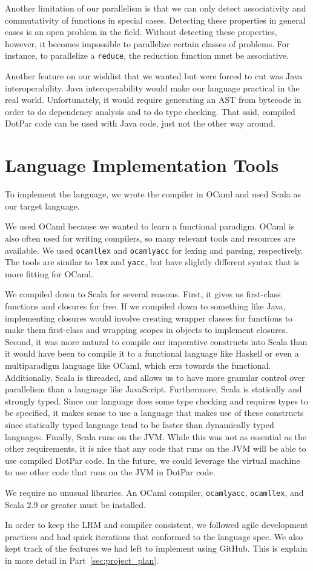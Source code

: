 Another limitation of our parallelism is that we can only detect associativity
and commutativity of functions in special cases. Detecting these properties in
general cases is an open problem in the field. Without detecting these
properties, however, it becomes impossible to parallelize certain classes of
problems. For instance, to parallelize a \verb$reduce$, the reduction function
must be associative.

Another feature on our wishlist that we wanted but were forced to cut was Java
interoperability. Java interoperability would make our language practical in the
real world. Unfortunately, it would require generating an AST from bytecode in
order to do dependency analysis and to do type checking. That said, compiled
DotPar code can be used with Java code, just not the other way around.

\section{Language Implementation Tools}
To implement the language, we wrote the compiler in OCaml and used Scala as our
target language.

We used OCaml because we wanted to learn a functional paradigm. OCaml is also
often used for writing compilers, so many relevant tools and resources are
available. We used \verb$ocamllex$ and \verb$ocamlyacc$ for lexing and parsing,
respectively. The tools are similar to \verb$lex$ and \verb$yacc$, but have
slightly different syntax that is more fitting for OCaml.

We compiled down to Scala for several reasons. First, it gives us first-class
functions and closures for free. If we compiled down to something like Java,
implementing closures would involve creating wrapper classes for functions to
make them first-class and wrapping scopes in objects to implement closures.
Second, it was more natural to compile our imperative constructs into Scala than
it would have been to compile it to a functional language like Haskell or even a
multiparadigm language like OCaml, which errs towards the functional.
Additionally, Scala is threaded, and allows us to have more granular control
over parallelism than a language like JavaScript. Furthermore, Scala is
statically and strongly typed. Since our language does some type checking and
requires types to be specified, it makes sense to use a language that makes use
of these constructs since statically typed language tend to be faster than
dynamically typed languages. Finally, Scala runs on the JVM\@. While this was not
as essential as the other requirements, it is nice that any code that runs on
the JVM will be able to use compiled DotPar code. In the future, we could
leverage the virtual machine to use other code that runs on the JVM in DotPar
code.

We require no unusual libraries. An OCaml compiler, \verb$ocamlyacc$,
\verb$ocamllex$, and Scala 2.9 or greater must be installed.

In order to keep the LRM and compiler consistent, we followed agile development
practices and had quick iterations that conformed to the language spec. We also
kept track of the features we had left to implement using GitHub. This is
explain in more detail in Part~\ref{sec:project_plan}.
